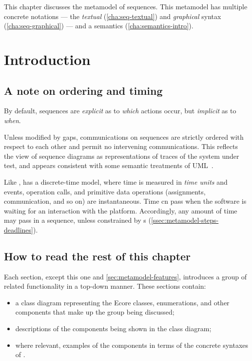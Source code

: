 

This chapter discusses the metamodel of \langname{} sequences.  This metamodel
has multiple concrete notations ---
the \emph{textual} (\cref{cha:seq-textual}) and \emph{graphical}
syntax (\cref{cha:seq-graphical}) --- and a semantics (\cref{cha:semantics-intro}). 

\section{Introduction}\label{sec:metamodel-intro}

\subsection{A note on ordering and timing}\label{ssec:metamodel-intro-ordering}

By default, \langname{} sequences are \emph{explicit}
as to \emph{which} actions occur, but \emph{implicit} as to
\emph{when}.

Unless modified by gaps,
communications on \langname{} sequences are strictly ordered with
respect to each other and permit no intervening communications.  This
reflects the view of sequence diagrams as representations of traces of
the system under test, and appears consistent with some semantic
treatments of UML~\cite{lima-semantics}.  

Like \robochart, \langname{} has a discrete-time model, where time is
measured in \emph{time units} and events, operation calls, and
primitive data operations (assignments, communication, and so on) are
instantaneous.  Time cn pass when the software is waiting for an
interaction with the platform.  Accordingly, any amount of time may
pass in a sequence, unless constrained by \mdeadlinestep s
(\cref{ssec:metamodel-steps-deadlines}).

\subsection{How to read the rest of this chapter}\label{ssec:metamodel-intro-readme}

Each section, except this one and \cref{sec:metamodel-features},
introduces a group of related \langname{}
functionality in a top-down manner.  These sections contain:

\begin{itemize}
\item
	a class diagram representing the Ecore classes, enumerations, and other
	components that make up the group being discussed;
\item
	descriptions of the components being shown in the class diagram;
\item
	where relevant, examples of the components in terms of the concrete
	syntaxes of \langname.
\end{itemize}

